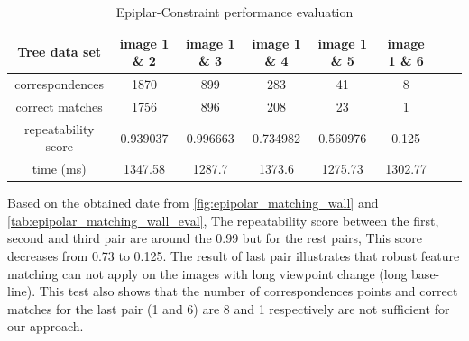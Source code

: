 \begin{table}[H]
  \begin{tabular}{| c || c | c | c | c | c | c | c |}
      \hline
      Tree data set & image 1 \& 2 & image 1 \& 3 & image 1 \& 4 & image 1 \& 5 & image 1 \& 6 \\ \hline \hline
      correspondences & 1870 & 899 & 283 & 41 & 8 \\ \hline
      correct matches & 1756 & 896 & 208 & 23 & 1 \\ \hline
      repeatability score & 0.939037 & 0.996663 & 0.734982 & 0.560976 & 0.125 \\ \hline
      time (ms) & 1347.58 & 1287.7 & 1373.6 & 1275.73 & 1302.77 \\ \hline
  \end{tabular}
  \caption{Epiplar-Constraint performance evaluation} \label{tab:epipolar_matching_wall_eval}
\end{table}

Based on the obtained date from \autoref{fig:epipolar_matching_wall} and \autoref{tab:epipolar_matching_wall_eval}, The repeatability score between the first, second and third pair are around the 0.99 but for the rest pairs, This score decreases from 0.73 to 0.125. The result of last pair illustrates that robust feature matching can not apply on the images with long viewpoint change (long base-line). This test also shows that the number of correspondences points and correct matches for the last pair (1 and 6) are 8 and 1 respectively are not sufficient for our approach.

